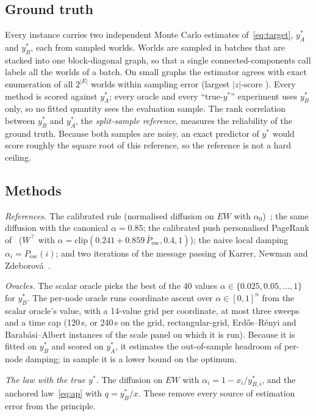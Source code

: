 \documentclass[11pt,a4paper]{article}
\theoremstyle{definition}
\theoremstyle{plain}
\newcommand{\Pesc}{P_{\mathrm{esc}}}
\newcommand{\Pescbar}{\bar{P}_{\mathrm{esc}}}
\newcommand{\clip}{\mathrm{clip}}
\begin{document}
\TabPanels

\subsection{Ground truth}\label{sec:gt}

Every instance carries two independent Monte Carlo estimates of~\eqref{eq:target}, $y^*_A$ and $y^*_B$, each from \MGT{} sampled worlds. Worlds are sampled in batches that are stacked into one block-diagonal graph, so that a single connected-components call labels all the worlds of a batch. On small graphs the estimator agrees with exact enumeration of all $2^{|E|}$ worlds within sampling error (largest $|z|$-score \MCExactZ). Every method is scored against $y^*_A$; every oracle and every ``true-$y^*$'' experiment uses $y^*_B$ only, so no fitted quantity sees the evaluation sample. The rank correlation between $y^*_B$ and $y^*_A$, the \emph{split-sample reference}, measures the reliability of the ground truth. Because both samples are noisy, an exact predictor of $y^*$ would score roughly the square root of this reference, so the reference is not a hard ceiling.

\subsection{Methods}\label{sec:methods}

\emph{References.} The calibrated rule (normalised diffusion on $EW$ with $\alpha_0$)~\cite{konstantellos26}; the same diffusion with the canonical $\alpha=0.85$; the calibrated push personalised PageRank of~\cite{konstantellos26} ($W^{\top}$ with $\alpha=\clip(0.241+0.859\,\Pescbar,0.4,1)$); the naive local damping $\alpha_i=\Pesc(i)$; and two iterations of the message passing of Karrer, Newman and Zdeborová~\cite{knz14}.

\emph{Oracles.} The scalar oracle picks the best of the 40 values $\alpha\in\{0.025,0.05,\dots,1\}$ for $y^*_B$. The per-node oracle runs coordinate ascent over $\alpha\in[0,1]^n$ from the scalar oracle's value, with a 14-value grid per coordinate, at most three sweeps and a time cap (120\,s, or 240\,s on the \NPernodeScale{} grid, rectangular-grid, Erdős--Rényi and Barabási--Albert instances of the scale panel on which it is run). Because it is fitted on $y^*_B$ and scored on $y^*_A$, it estimates the out-of-sample headroom of per-node damping; in sample it is a lower bound on the optimum.

\emph{The law with the true $y^*$.} The diffusion on $EW$ with $\alpha_i=1-x_i/y^*_{B,i}$, and the anchored law~\eqref{eq:ap} with $q=y^*_B/x$. These remove every source of estimation error from the principle.
\end{document}
